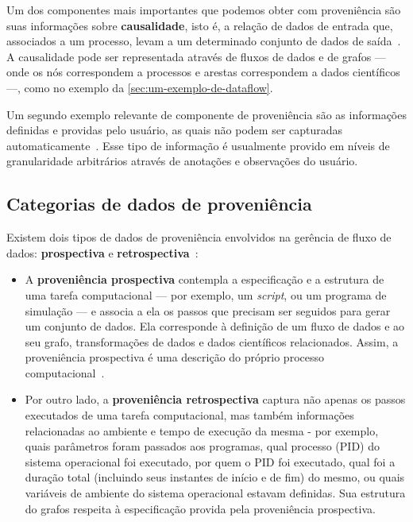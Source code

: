 Um dos componentes mais importantes que podemos obter com proveniência são suas informações sobre \textbf{causalidade}, isto é, a relação de dados de entrada que, associados a um processo, levam a um determinado conjunto de dados de saída~\cite{freire2008provenance}. A causalidade pode ser representada através de fluxos de dados e de grafos --- onde os nós correspondem a processos e arestas correspondem a dados científicos ---, como no exemplo da \autoref{sec:um-exemplo-de-dataflow}.

Um segundo exemplo relevante de componente de proveniência são as informações definidas e providas pelo usuário, as quais não podem ser capturadas automaticamente~\cite{freire2008provenance}. Esse tipo de informação é usualmente provido em níveis de granularidade arbitrários através de anotações e observações do usuário.

\subsection{Categorias de dados de proveniência}%
\label{subsec:categorias-de-dados-de-proveniencia}

Existem dois tipos de dados de proveniência envolvidos na gerência de fluxo de dados: \textbf{prospectiva} e \textbf{retrospectiva}~\cite{murta2014noworkflow,freire2008provenance}:

\begin{itemize}
    \item A \textbf{proveniência prospectiva} contempla a especificação e a estrutura de uma tarefa computacional --- por exemplo, um \textit{script}, ou um programa de simulação --- e associa a ela os passos que precisam ser seguidos para gerar um conjunto de dados. Ela corresponde à definição de um fluxo de dados e ao seu grafo, transformações de dados e dados científicos relacionados. Assim, a proveniência prospectiva é uma descrição do próprio processo computacional~\cite{mcphillips2015yesworkflow}.
    \item Por outro lado, a \textbf{proveniência retrospectiva} captura não apenas os passos executados de uma tarefa computacional, mas também informações relacionadas ao ambiente e tempo de execução da mesma - por exemplo, quais parâmetros foram passados aos programas, qual  processo (PID) do sistema operacional foi executado, por quem o PID foi executado, qual foi a duração total (incluindo seus instantes de início e de fim) do mesmo, ou quais variáveis de ambiente do sistema operacional estavam definidas. Sua estrutura do grafos respeita à especificação provida pela proveniência prospectiva.
\end{itemize}

